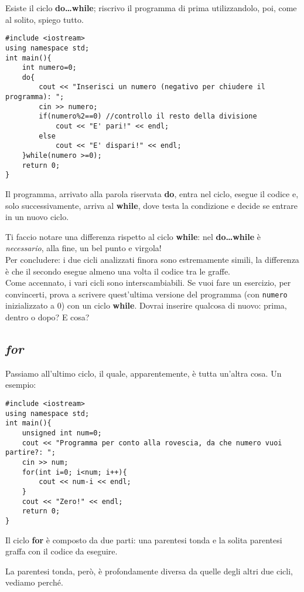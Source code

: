 	Esiste il ciclo \textbf{do\ldots while}; riscrivo il programma di prima utilizzandolo, poi, come al solito, spiego tutto.
	
	\begin{lstlisting}
#include <iostream>
using namespace std;
int main(){
	int numero=0;
	do{
		cout << "Inserisci un numero (negativo per chiudere il programma): ";
		cin >> numero;
		if(numero%2==0) //controllo il resto della divisione
			cout << "E' pari!" << endl;
		else
			cout << "E' dispari!" << endl;
	}while(numero >=0);
	return 0;
}
	\end{lstlisting}
	Il programma, arrivato alla parola riservata \textbf{do}, entra nel ciclo, esegue il codice e, solo successivamente, arriva al \textbf{while}, dove testa la condizione e decide se entrare in un nuovo ciclo.
	
	Ti faccio notare una differenza rispetto al ciclo \textbf{while}: nel \textbf{do\ldots while} è \emph{necessario}, alla fine, un bel punto e virgola! \\
	
	Per concludere: i due cicli analizzati finora sono estremamente simili, la differenza è che il secondo esegue almeno una volta il codice tra le graffe.\\
	
	Come accennato, i vari cicli sono interscambiabili. Se vuoi fare un esercizio, per convincerti, prova a scrivere quest'ultima versione del programma (con \verb|numero| inizializzato a 0) con un ciclo \textbf{while}. Dovrai inserire qualcosa di nuovo: prima, dentro o dopo? E cosa?	
	
	\subsection{\emph{for}} 
	Passiamo all'ultimo ciclo, il quale, apparentemente, è tutta un'altra cosa. Un esempio:
\begin{lstlisting}
#include <iostream>
using namespace std;
int main(){
	unsigned int num=0;
	cout << "Programma per conto alla rovescia, da che numero vuoi partire?: ";
	cin >> num;
	for(int i=0; i<num; i++){
		cout << num-i << endl;
	}
	cout << "Zero!" << endl;
	return 0;
}
\end{lstlisting}
	Il ciclo \textbf{for} è composto da due parti: una parentesi tonda e la solita parentesi graffa con il codice da eseguire.
	
	La parentesi tonda, però, è profondamente diversa da quelle degli altri due cicli, vediamo perché.
	
